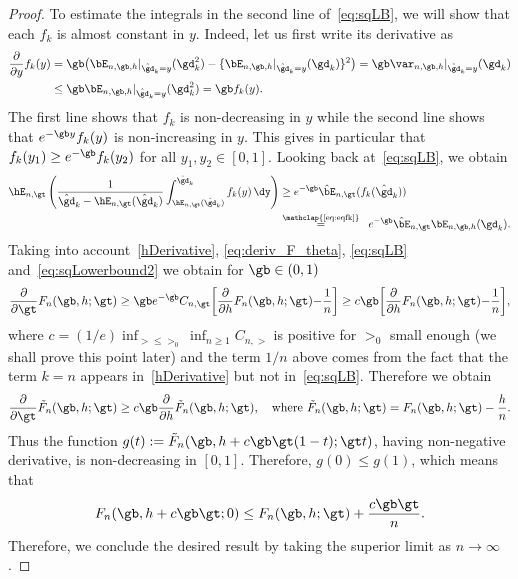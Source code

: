 \begin{proof}
To estimate the integrals in the second line of~\eqref{eq:sqLB}, we will show that each $f_k$ is almost constant in $y$. Indeed, let us first write its derivative as
\begin{align}
\begin{aligned}
\frac{\partial}{\partial y} f_k(y) &= \gb \big(\bE_{n,\gb,h}|_{\hat \gd_k = y}(\gd_k^2) - \{\bE_{n,\gb,h}|_{\hat \gd_k = y}(\gd_k)\}^2 \big) = \gb \var_{n,\gb,h}|_{\hat \gd_k = y}(\gd_k)\\
&\leq \gb \bE_{n,\gb,h}|_{\hat \gd_k = y}(\gd_k^2) = \gb f_k(y).
\end{aligned}
\end{align}
The first line shows that $f_k$ is non-decreasing in $y$ while the second line shows that $e^{-\gb y} f_k(y)$ is non-increasing in $y$. This gives in particular that $f_k(y_1)\ge e^{-\gb} f_k(y_2)$ for all $y_1, y_2\in [0,1]$. Looking back at~\eqref{eq:sqLB}, we obtain
\begin{align}\label{eq:sqLowerbound2}
\begin{aligned}
\hE_{n,\gt} \left(\frac{1}{\hat\gd_k - \hE_{n,\gt} (\hat\gd_k)} \int_{\hE_{n,\gt} (\hat\gd_k)}^{\hat\gd_k} f_k(y) \, \dy \right) &\geq e^{- \gb} \hat\bE_{n,\gt} (f_k(\hat\gd_k))\\
&\stackrel{\mathclap{\text{\eqref{eq:eqfk}}}}{=}\;\; e^{- \gb} \hat\bE_{n,\gt} \bE_{n,\gb,h} (\gd_k).
\end{aligned}
\end{align}
Taking into account~\eqref{hDerivative}, \eqref{eq:deriv_F_theta}, \eqref{eq:sqLB} and~\eqref{eq:sqLowerbound2} we obtain for $\gb\in (0,1)$
\begin{equation}
\frac{\partial}{\partial \gt} F_n(\gb,h;\gt) \geq \gb e^{- \gb} C_{n,\gt} \bigg[\frac{\partial}{\partial h} F_n(\gb,h;\gt) { - \frac1n} \bigg] \geq c \gb \bigg[\frac{\partial}{\partial h} F_n(\gb,h;\gt) { - \frac1n} \bigg],
\end{equation}
where $c = { (1/e)} \inf_{\gt \le \gt_0} \inf_{n \geq 1} C_{n,\gt}$ is positive for $\gt_0$ small enough (we shall prove this point later) and the term $1/n$ above comes from the fact that the term $k=n$ appears in~\eqref{hDerivative} but not in~\eqref{eq:sqLB}. Therefore we obtain
\begin{equation}
\frac{\partial}{\partial \gt} \tilde F_n(\gb,h;\gt) \geq c \gb \frac{\partial}{\partial h} \tilde F_n(\gb,h;\gt), \quad \text{where } \tilde F_n(\gb,h;\gt) = F_n(\gb,h;\gt) - \frac{h}{n}.
\end{equation} Thus the function $g(t) := { \tilde F_n(\gb,h + c \gb \gt (1 - t);\gt t)}$, having non-negative derivative, is non-decreasing in $[0,1]$. Therefore, $g(0) \leq g(1)$, which means that
\begin{equation}
F_n(\gb,h + c \gb \gt;0) \leq F_n(\gb,h;\gt) + \frac{c\gb\gt}{n}.
\end{equation}
Therefore, we conclude the desired result by taking the superior limit as $n \to \infty$.


\end{proof}

